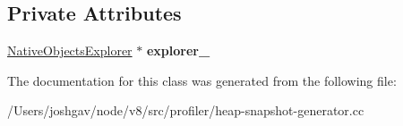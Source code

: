 \subsection*{Private Attributes}
\begin{DoxyCompactItemize}
\item 
\hyperlink{classv8_1_1internal_1_1_native_objects_explorer}{Native\+Objects\+Explorer} $\ast$ {\bfseries explorer\+\_\+}\hypertarget{classv8_1_1internal_1_1_global_handles_extractor_abd5e542855365209a29fa3e2b27f449c}{}\label{classv8_1_1internal_1_1_global_handles_extractor_abd5e542855365209a29fa3e2b27f449c}

\end{DoxyCompactItemize}


The documentation for this class was generated from the following file\+:\begin{DoxyCompactItemize}
\item 
/\+Users/joshgav/node/v8/src/profiler/heap-\/snapshot-\/generator.\+cc\end{DoxyCompactItemize}
